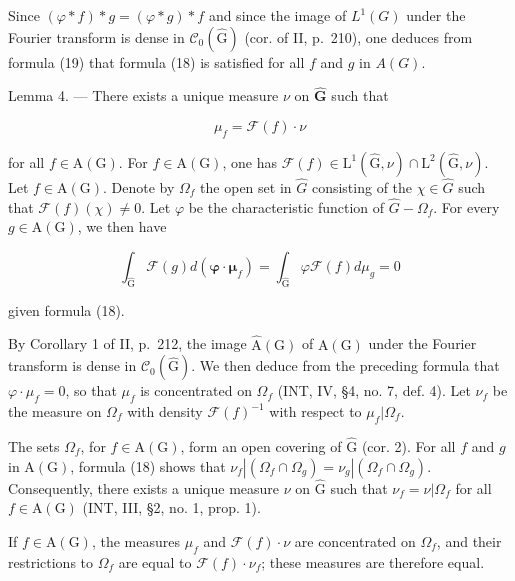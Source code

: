 Since \((\varphi*f)*g=(\varphi*g)*f\) and since the image of \(L^{1}(G)\) under the Fourier transform is dense in \(\mathcal{C}_{0}(\widehat{\mathrm{G}})\) (cor. of II, p.~210), one deduces from formula (19) that formula (18) is satisfied for all \(f\) and \(g\) in \(A(G)\).

Lemma 4. --- There exists a unique measure \(\nu\) on \(\widehat{\mathbf{G}}\) such that

\[
\mu_ {f} = \mathcal {F} (f) \cdot \nu
\]

for all \(f \in \mathrm{A}(\mathrm{G})\). For \(f \in \mathrm{A}(\mathrm{G})\), one has \(\mathcal{F}(f) \in \mathrm{L}^{1}(\widehat{\mathrm{G}}, \nu) \cap \mathrm{L}^{2}(\widehat{\mathrm{G}}, \nu)\). Let \(f \in \mathrm{A}(\mathrm{G})\). Denote by \(\Omega_{f}\) the open set in \(\widehat{G}\) consisting of the \(\chi \in \widehat{G}\) such that \(\mathcal{F}(f)(\chi) \neq 0\). Let \(\varphi\) be the characteristic function of \(\widehat{G} - \Omega_{f}\). For every \(g \in \mathrm{A}(\mathrm{G})\), we then have

\[
\int_ {\widehat {\mathrm{G}}} \mathcal {F} (g) d (\boldsymbol {\varphi} \cdot \boldsymbol {\mu} _ {f}) = \int_ {\widehat {\mathrm{G}}} \varphi \mathcal {F} (f) d \mu_ {g} = 0
\]

given formula (18).

By Corollary 1 of II, p.~212, the image \(\widehat{\mathrm{A}}(\mathrm{G})\) of \(\mathrm{A}(\mathrm{G})\) under the Fourier transform is dense in \(\mathcal{C}_0(\widehat{\mathrm{G}})\). We then deduce from the preceding formula that \(\varphi \cdot \mu_f = 0\), so that \(\mu_f\) is concentrated on \(\Omega_f\) (INT, IV, §4, no. 7, def. 4). Let \(\nu_f\) be the measure on \(\Omega_f\) with density \(\mathcal{F}(f)^{-1}\) with respect to \(\mu_f|\Omega_f\).

The sets \(\Omega_f\), for \(f \in \mathrm{A}(\mathrm{G})\), form an open covering of \(\widehat{\mathrm{G}}\) (cor. 2). For all \(f\) and \(g\) in \(\mathrm{A}(\mathrm{G})\), formula (18) shows that \(\nu_f|(\Omega_f \cap \Omega_g) = \nu_g|(\Omega_f \cap \Omega_g)\). Consequently, there exists a unique measure \(\nu\) on \(\widehat{\mathrm{G}}\) such that \(\nu_f = \nu|\Omega_f\) for all \(f \in \mathrm{A}(\mathrm{G})\) (INT, III, §2, no. 1, prop. 1).

If \(f \in \mathrm{A}(\mathrm{G})\), the measures \(\mu_f\) and \(\mathcal{F}(f) \cdot \nu\) are concentrated on \(\Omega_f\), and their restrictions to \(\Omega_f\) are equal to \(\mathcal{F}(f) \cdot \nu_f\); these measures are therefore equal.

